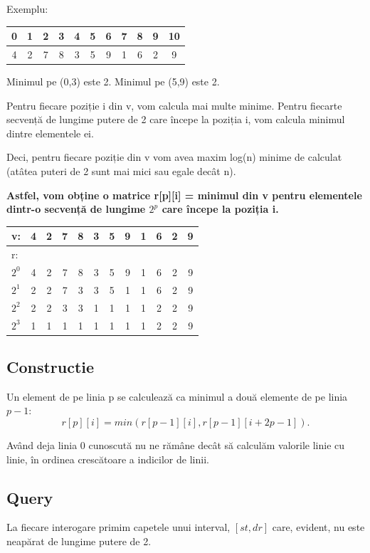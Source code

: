 \documentclass[11pt,a4paper]{article}
\theoremstyle{definition}
\theoremstyle{plain}
\theoremstyle{remark}
\begin{document}
Exemplu:

\bigskip
\begin{tabular}{|c|c|c|c|c|c|c|c|c|c|c|}
\hline
0 & 1 & 2 & 3 & 4 & 5 & 6 & 7 & 8 & 9 & 10\\
\hline
4 & 2 & 7 & 8 & 3 & 5 & 9 & 1 & 6 & 2 & 9 \\
\hline
\end{tabular}
\bigskip

Minimul pe (0,3) este 2. Minimul pe (5,9) este 2.

Pentru fiecare poziție i din v, vom calcula mai multe minime. Pentru fiecarte secvență de lungime putere de 2 care începe la poziția i, vom calcula minimul dintre elementele ei.

Deci, pentru fiecare poziție din v vom avea maxim log(n) minime de calculat (atâtea puteri de 2 sunt mai mici sau egale decât n).

\textbf{Astfel, vom obține o matrice r[p][i] = minimul din v pentru elementele dintr-o secvență de lungime $2^p$ care începe la poziția i.}

\bigskip
\begin{tabular}{|l|c|c|c|c|c|c|c|c|c|c|c|}
\hline
v: & 4 & 2 & 7 & 8 & 3 & 5 & 9 & 1 & 6 & 2 & 9 \\
\hline
r: & & & & & & & & & & & \\
\hline
$2^0$ & 4 & 2 & 7 & 8 & 3 & 5 & 9 & 1 & 6 & 2 & 9 \\
\hline
$2^1$ & 2 & 2 & 7 & 3 & 3 & 5 & 1 & 1 & 6 & 2 & 9 \\
\hline
$2^2$ & 2 & 2 & 3 & 3 & 1 & 1 & 1 & 1 & 2 & 2 & 9 \\
\hline
$2^3$ & 1 & 1 & 1 & 1 & 1 & 1 & 1 & 1 & 2 & 2 & 9 \\
\hline
\end{tabular}
\bigskip

\subsection*{Constructie}
Un element de pe linia p se calculează ca minimul a două elemente de pe linia $p-1$:
$$r[p][i] = min (r[p-1][i], r[p-1][i+2
p-1]).$$

Având deja linia 0 cunoscută nu ne rămâne decât să calculăm valorile linie cu linie, în ordinea crescătoare a indicilor de linii.

\subsection*{Query}
La fiecare interogare primim capetele unui interval, $[st, dr]$ care, evident, nu este neapărat de lungime putere de 2.
\end{document}
